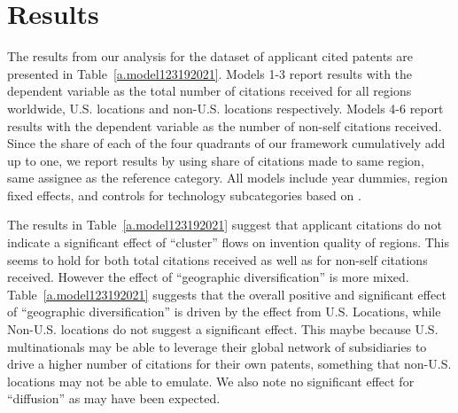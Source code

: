 \documentclass[12pt,letterpaper]{article}
\begin{document}




%
%
%


\section{Results}
The  results from our analysis for the dataset of applicant  cited patents are presented in Table~\ref{a.model123192021}. Models 1-3 report results with the dependent variable as the total number of citations received for all regions worldwide, U.S. locations and non-U.S. locations respectively. Models 4-6 report results with the dependent variable as the number of non-self citations received. Since the share of each of the four quadrants of our framework cumulatively add up to one, we report results by using share of citations made to same region, same assignee as the reference category. All models include year dummies, region fixed effects, and controls for technology subcategories based on \cite*{Hall2001a}. \par


The results in Table~\ref{a.model123192021} suggest that applicant citations do not indicate a significant effect of ``cluster'' flows on invention quality of regions. This seems to hold for both total citations received as well as for non-self citations received. However the effect of ``geographic diversification'' is more mixed. Table~\ref{a.model123192021} suggests that the overall positive and significant effect of ``geographic diversification'' is driven by the effect from U.S. Locations, while Non-U.S. locations do not suggest a significant effect. This maybe because U.S. multinationals may be able to leverage their global network of subsidiaries to drive a higher number of citations for their own patents, something that non-U.S. locations may not be able to emulate. We also note no significant effect for ``diffusion'' as may have been expected.


\end{document}
